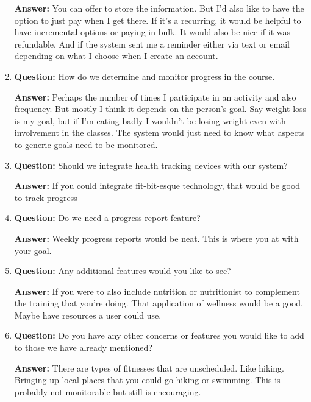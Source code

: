 \documentclass[12pt]{article}
\begin{document}
\begin{enumerate}
\textbf{Answer:} You can offer to store the information.  But I’d also like to have the option to just pay when I get there.  If it’s a recurring, it would be helpful to have incremental options or paying in bulk.  It would also be nice if it was refundable.  And if the system sent me a reminder either via text or email depending on what I choose when I create an account.

\item \textbf{Question:}  How do we determine and monitor progress in the course.

\textbf{Answer:}  Perhaps the number of times I participate in an activity and also frequency.  But mostly I think it depends on the person’s goal.  Say weight loss is my goal, but if I’m eating badly I wouldn’t be losing weight even with involvement in the classes. The system would just need to know what aspects to generic goals need to be monitored.

\item \textbf{Question:}  Should we integrate health tracking devices with our system?

\textbf{Answer:}  If you could integrate fit-bit-esque technology,  that would be good to track progress

\item \textbf{Question:} Do we need a progress report feature? 

\textbf{Answer:}  Weekly progress reports would be neat.  This is where you at with your goal.

\item \textbf{Question:}  Any additional features would you like to see? 

\textbf{Answer:}  If you were to also include nutrition or nutritionist to complement the training that you’re doing. That application of wellness would be a good.  Maybe have resources a user could use.

\item \textbf{Question:}  Do you have any other concerns or features you would like to add to those we have already mentioned?

\textbf{Answer:}  There are types of fitnesses that are unscheduled.  Like hiking.  Bringing up local places that you could go hiking or swimming. This is probably not monitorable but still is encouraging.

\end{enumerate}
\end{document}

